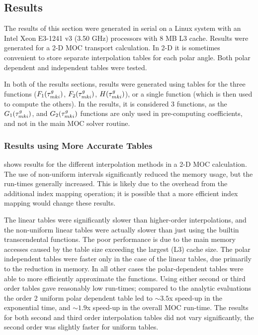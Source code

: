 {{    \subsection{Results}{\label{ssec:LSMOC:ET:Results}
      The results of this section were generated in serial on a Linux system with an Intel Xeon E3-1241 v3 (3.50 GHz) processors with 8 MB L3 cache.
      Results were generated for a 2-D \ac{MOC} transport calculation.
      In 2-D it is sometimes convenient to store separate interpolation tables for each polar angle.
      Both polar dependent and independent tables were tested.

      In both of the results sections, results were generated using tables for the three functions ($F_1(\segopt)$, $F_2(\segopt)$, $H(\segopt)$), or a single function (which is then used to compute the others).
      In the results, it is considered 3 functions, as the $G_1(\segopt)$, and $G_2(\segopt)$ functions are only used in pre-computing coefficients, and not in the main \ac{MOC} solver routine.

      \subsubsection{Results using More Accurate Tables}{\label{sssec:LSMOC:ET:Results using More Accurate Tables}
         shows results for the different interpolation methods in a 2-D \ac{MOC} calculation.
        The use of non-uniform intervals significantly reduced the memory usage, but the run-times generally increased.
        This is likely due to the overhead from the additional index mapping operation; it is possible that a more efficient index mapping would change these results.

        The linear tables were significantly slower than higher-order interpolations, and the non-uniform linear tables were actually slower than just using the builtin transcendental functions.
        The poor performance is due to the main memory accesses caused by the table size exceeding the largest (L3) cache size.
        The polar independent tables were faster only in the case of the linear tables, due primarily to the reduction in memory.
        In all other cases the polar-dependent tables were able to more efficiently approximate the functions.
        Using either second or third order tables gave reasonably low run-times; compared to the analytic evaluations the order 2 uniform polar dependent table led to $\sim 3.5$x speed-up in the exponential time, and $\sim 1.9$x speed-up in the overall \ac{MOC} run-time.
        The results for both second and third order interpolation tables did not vary significantly, the second order was slightly faster for uniform tables.

}}}}
